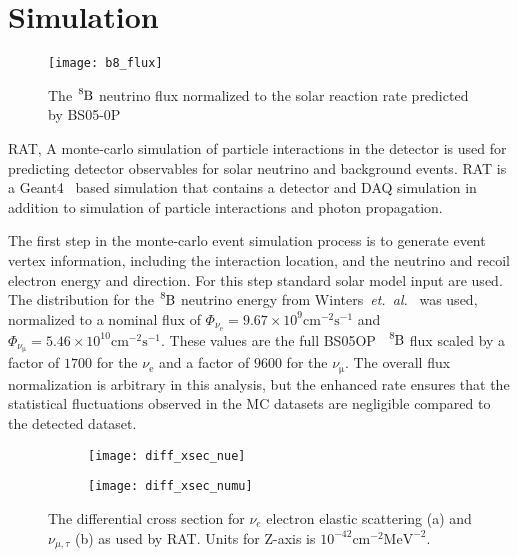 \section{Simulation}
\label{sec:simulation}
\begin{figure}[htbp]
\centering
\texttt{[image: b8\_flux]}
\caption[Expected $\ce{^{8}B}$ Flux]{The $\ce{^{8}B}$ neutrino flux
normalized to the solar reaction rate predicted by BS05-0P~\citep{bs_ssm}}
\label{fig:b8_flux}
\end{figure}

RAT, A monte-carlo simulation of particle interactions in the detector is used
for predicting detector observables for solar neutrino and background events.
RAT is a Geant4~\citep{geant4} based simulation that
contains a detector and DAQ simulation in addition to simulation of particle
interactions and photon propagation.

The first step in the monte-carlo event simulation process is to generate
event vertex information, including the interaction location, and the neutrino
and recoil electron energy and direction.
For this step standard solar model input are used.
The distribution for the $\ce{^{8}B}$ neutrino energy from Winters~\textit{et.\ al.}~\citep{winterspectrum}
was used, normalized to a nominal flux of
$\Phi_{\nu_{\mathrm{e}}} = 9.67\times10^{9}\mathrm{cm}^{-2}\mathrm{s}^{-1}$
and
$\Phi_{\nu_{\mathrm{\mu}}} = 5.46\times10^{10}\mathrm{cm}^{-2}\mathrm{s}^{-1}$.
These values are the full BS05OP~\cite{bs_ssm} $\ce{^{8}B}$ flux scaled by a factor
of $1700$ for the $\nu_{\mathrm{e}}$ and a factor of $9600$ for the $\nu_{\mathrm{\mu}}$.
The overall flux normalization is arbitrary in this analysis, but the enhanced rate
ensures that the statistical fluctuations observed in the MC datasets are
negligible compared to the detected dataset.

\begin{figure}[htbp]
  \centering
  \begin{subfigure}[b]{0.48\textwidth}
    \centering
  \texttt{[image: diff\_xsec\_nue]}
    \caption[$\nu_{e}$ Differential Cross Section]{}
    \label{fig:diff_xsec_nue}
  \end{subfigure}
  \hfill
  \begin{subfigure}[b]{0.48\textwidth}
    \centering
  \texttt{[image: diff\_xsec\_numu]}
    \caption[$\nu_{\mu}$ Differential Cross Section]{}
    \label{fig:diff_xsec_numu}
  \end{subfigure}
    \caption[ES Differential Cross Section]{The differential cross section for $\nu_{e}$ electron
    elastic scattering (a) and $\nu_{\mu\mathrm{,}\tau}$ (b) as used by
    RAT. Units for Z-axis is $10^{-42} \mathrm{cm}^{-2} \mathrm{MeV}^{-2}$.}
    \label{fig:diff_xsec}
\end{figure}

